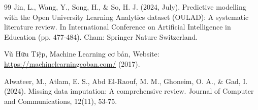 \documentclass[a4paper]{report}
\begin{document}
\begin{thebibliography}{99}
  Jin, L., Wang, Y., Song, H., \& So, H. J. (2024, July). 
  Predictive modelling with the Open University Learning Analytics dataset
  (OULAD): A systematic literature review. 
  In International Conference on Artificial Intelligence in Education (pp. 477-484). 
  Cham: Springer Nature Switzerland.

  Vũ Hữu Tiệp, Machine Learning cơ bản, Website:
  \url{https://machinelearningcoban.com/} (2017).

  Alwateer, M., Atlam, E. S., Abd El-Raouf, M. M., Ghoneim, O. A., \& Gad, I. (2024). 
  Missing data imputation: A comprehensive review. 
  Journal of Computer and Communications, 12(11), 53-75.
\end{thebibliography}
\end{document}

